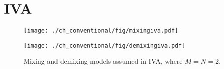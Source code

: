 \section{IVA}
\label{sec:conv:iva}
\begin{figure}[htbp]
      \begin{minipage}[t]{0.45\hsize}
        \centering
        \texttt{[image: ./ch\_conventional/fig/mixingiva.pdf]}
        \label{fig:mixingiva}
      \end{minipage} 
      \begin{minipage}[t]{0.45\hsize}
        \centering
        \texttt{[image: ./ch\_conventional/fig/demixingiva.pdf]}
        \label{fig:demixingiva}
      \end{minipage} 
     \caption{Mixing and demixing models assumed in IVA, where $M=N=2$.}
     \label{fig:ivamodel}
  \end{figure}



